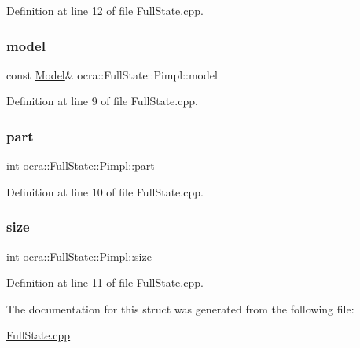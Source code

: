 Definition at line 12 of file Full\+State.\+cpp.

\hypertarget{structocra_1_1FullState_1_1Pimpl_ac8e2409d7e4a099fdb6fc3ef9c7d3026}{}\label{structocra_1_1FullState_1_1Pimpl_ac8e2409d7e4a099fdb6fc3ef9c7d3026} 
\subsubsection{\texorpdfstring{model}{model}}
{\footnotesize\ttfamily const \hyperlink{classocra_1_1Model}{Model}\& ocra\+::\+Full\+State\+::\+Pimpl\+::model}



Definition at line 9 of file Full\+State.\+cpp.

\hypertarget{structocra_1_1FullState_1_1Pimpl_ab10f6e199d008d84731024cb80772a5d}{}\label{structocra_1_1FullState_1_1Pimpl_ab10f6e199d008d84731024cb80772a5d} 
\subsubsection{\texorpdfstring{part}{part}}
{\footnotesize\ttfamily int ocra\+::\+Full\+State\+::\+Pimpl\+::part}



Definition at line 10 of file Full\+State.\+cpp.

\hypertarget{structocra_1_1FullState_1_1Pimpl_a5deca911251aa5b774b3cf7f3f6bd5d4}{}\label{structocra_1_1FullState_1_1Pimpl_a5deca911251aa5b774b3cf7f3f6bd5d4} 
\subsubsection{\texorpdfstring{size}{size}}
{\footnotesize\ttfamily int ocra\+::\+Full\+State\+::\+Pimpl\+::size}



Definition at line 11 of file Full\+State.\+cpp.



The documentation for this struct was generated from the following file\+:\begin{DoxyCompactItemize}
\item 
\hyperlink{FullState_8cpp}{Full\+State.\+cpp}\end{DoxyCompactItemize}
